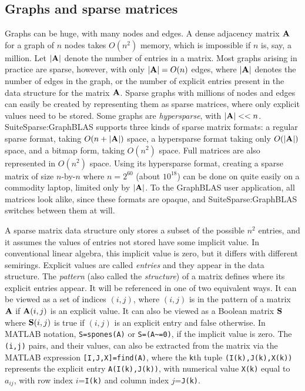 \documentclass[12pt]{article}
\begin{document}
\subsection{Graphs and sparse matrices} %
\label{sparse}

Graphs can be huge, with many nodes and edges.  A dense adjacency matrix ${\bf
A}$ for a graph of $n$ nodes takes $O(n^2)$ memory, which is impossible if $n$
is, say, a million.  Let $|{\bf A}|$ denote the number of entries in a matrix.
Most graphs arising in practice are sparse, however, with only $|{\bf A}|=O(n)$
edges, where $|{\bf A}|$ denotes the number of edges in the graph, or the
number of explicit entries present in the data structure for the matrix ${\bf
A}$.  Sparse graphs with millions of nodes and edges can easily be created by
representing them as sparse matrices, where only explicit values need to be
stored.  Some graphs are {\em hypersparse}, with ${|\bf A}| << n$.
SuiteSparse:GraphBLAS supports three kinds of sparse matrix formats: a regular
sparse format, taking $O(n+|{\bf A}|)$ space, a hypersparse format taking only
$O(|{\bf A}|)$ space, and a bitmap form, taking $O(n^2)$ space.  Full matrices
are also represented in $O(n^2)$ space.  Using its hypersparse format, creating
a sparse matrix of size $n$-by-$n$ where $n=2^{60}$ (about $10^{18}$) can be
done on quite easily on a commodity laptop, limited only by $|{\bf A}|$.
To the GraphBLAS user application, all matrices look alike, since these formats
are opaque, and SuiteSparse:GraphBLAS switches between them at will.

A sparse matrix data structure only stores a subset of the possible $n^2$
entries, and it assumes the values of entries not stored have some implicit
value.  In conventional linear algebra, this implicit value is zero, but it
differs with different semirings.  Explicit values are called {\em entries} and
they appear in the data structure.  The {\em pattern} (also called the
{\em structure}) of a matrix  defines where its explicit entries appear.  It
will be referenced in one of two equivalent ways.  It can be viewed as a set of
indices $(i,j)$, where $(i,j)$ is in the pattern of a matrix ${\bf A}$ if ${\bf
A}(i,j)$ is an explicit value.  It can also be viewed as a Boolean matrix ${\bf
S}$ where ${\bf S}(i,j)$ is true if $(i,j)$ is an explicit entry and false
otherwise.  In MATLAB notation, \verb'S=spones(A)' or \verb'S=(A~=0)', if the
implicit value is zero.  The \verb'(i,j)' pairs, and their values, can also be
extracted from the matrix via the MATLAB expression \verb'[I,J,X]=find(A)',
where the \verb'k'th tuple \verb'(I(k),J(k),X(k))' represents the explicit
entry \verb'A(I(k),J(k))', with numerical value \verb'X(k)' equal to $a_{ij}$,
with row index $i$=\verb'I(k)' and column index $j$=\verb'J(k)'.
\end{document}
